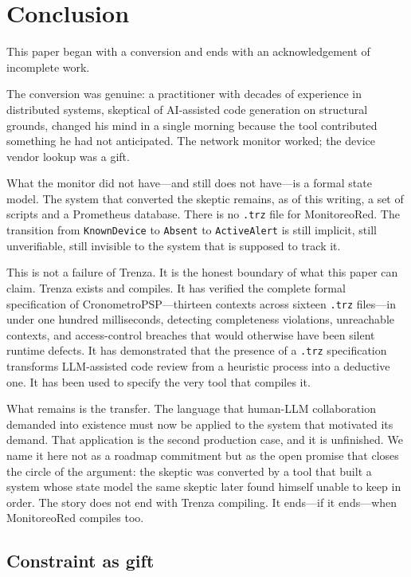 \section{Conclusion}
\label{sec:conclusion}

This paper began with a conversion and ends with an acknowledgement of
incomplete work.

The conversion was genuine: a practitioner with decades of experience in
distributed systems, skeptical of AI-assisted code generation on structural
grounds, changed his mind in a single morning because the tool contributed
something he had not anticipated. The network monitor worked; the device vendor
lookup was a gift.

What the monitor did not have---and still does not have---is a formal state
model. The system that converted the skeptic remains, as of this writing, a set
of scripts and a Prometheus database. There is no \texttt{.trz} file for
MonitoreoRed. The transition from \texttt{KnownDevice} to
\texttt{Absent} to \texttt{ActiveAlert} is still implicit, still
unverifiable, still invisible to the system that is supposed to track it.

This is not a failure of Trenza. It is the honest boundary of what this paper
can claim. Trenza exists and compiles. It has verified the complete formal
specification of CronometroPSP---thirteen contexts across sixteen \texttt{.trz}
files---in under one hundred milliseconds, detecting completeness violations,
unreachable contexts, and access-control breaches that would otherwise have been
silent runtime defects. It has demonstrated that the presence of a
\texttt{.trz} specification transforms LLM-assisted code review from a
heuristic process into a deductive one. It has been used to specify the very
tool that compiles it.

What remains is the transfer. The language that human-LLM collaboration demanded
into existence must now be applied to the system that motivated its demand. That
application is the second production case, and it is unfinished. We name it
here not as a roadmap commitment but as the open promise that closes the circle
of the argument: the skeptic was converted by a tool that built a system whose
state model the same skeptic later found himself unable to keep in order. The
story does not end with Trenza compiling. It ends---if it ends---when
MonitoreoRed compiles too.

\subsection*{Constraint as gift}

